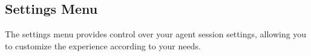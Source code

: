 \subsection*{Settings Menu}

The settings menu provides control over your agent session settings, allowing you to customize the experience according to your needs.
